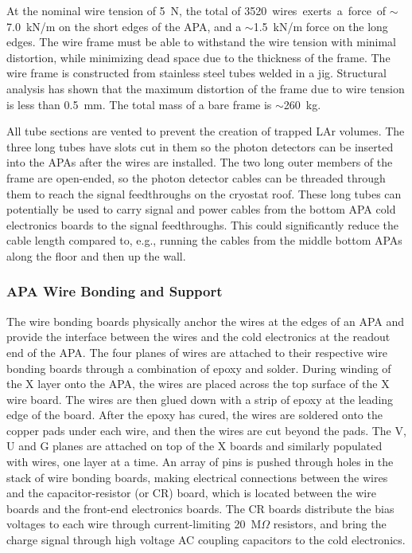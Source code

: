 At the nominal wire tension of 5~N, the total of \SI{3520} wires
exerts a force of $\sim$7.0~kN/m on the short edges of the APA, and a
$\sim$1.5~kN/m force on the long edges. The wire frame must be able to
withstand the wire tension with minimal distortion, while minimizing
dead space due to the thickness of the frame.  The wire frame is
constructed from stainless steel tubes welded in a jig.  Structural
analysis has shown that the maximum distortion of the frame due to
wire tension is less than 0.5~mm. The total mass of a bare frame is
$\sim$260~kg.


All tube sections are vented to prevent the creation of trapped LAr
volumes. The three long tubes have slots cut in them so the photon
detectors can be inserted into the APAs after the wires are installed.
The two long outer members of the frame are open-ended, so the photon
detector cables can be threaded through them to reach the signal
feedthroughs on the cryostat roof.  These long tubes can potentially
be used to carry signal and power cables from the bottom APA cold
electronics boards to the signal feedthroughs.  This could
significantly reduce the cable length compared to, e.g., running the
cables from the middle bottom APAs along the floor and then up the
wall.


\subsubsection{APA Wire Bonding and Support}
\label{subsec:fd-ref-wirewrap}


The wire bonding boards physically anchor the wires at the edges of an
APA and provide the interface between the wires and the cold
electronics at the readout end of the APA.  The four planes of wires
are attached to their respective wire bonding boards through a
combination of epoxy and solder. During winding of the X layer onto
the APA, the wires are placed across the top surface of the X wire
board. The wires are then glued down with a strip of epoxy at the
leading edge of the board.  After the epoxy has cured, the wires are
soldered onto the copper pads under each wire, and then the wires are
cut beyond the pads. The V, U and G planes are attached on top of the
X boards and similarly populated with wires, one layer at a time. An
array of pins is pushed through holes in the stack of wire bonding
boards, making electrical connections between the wires and the
capacitor-resistor (or CR) board, which is located between the wire
boards and the front-end electronics boards.  The CR boards distribute
the bias voltages to each wire through current-limiting 20~M$\Omega$
resistors, and bring the charge signal through high voltage AC
coupling capacitors to the cold electronics.

